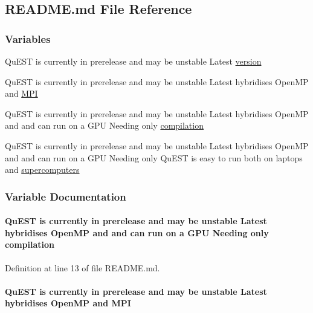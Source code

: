\hypertarget{README_8md}{
\subsection{README.md File Reference}
\label{README_8md}
}
\subsubsection*{Variables}
\begin{DoxyCompactItemize}
\item 
QuEST is currently in prerelease and may be unstable Latest \hyperlink{README_8md_a94df19ae37ab2d673ea00c5d31754e61}{version}
\item 
QuEST is currently in prerelease and may be unstable Latest hybridises OpenMP and \hyperlink{README_8md_a0a40be130c04118a27bcd009eebdaa7b}{MPI}
\item 
QuEST is currently in prerelease and may be unstable Latest hybridises OpenMP and and can run on a GPU Needing only \hyperlink{README_8md_a9deb99efd500e3c4a12304d32da47e19}{compilation}
\item 
QuEST is currently in prerelease and may be unstable Latest hybridises OpenMP and and can run on a GPU Needing only QuEST is easy to run both on laptops and \hyperlink{README_8md_a1a0088f6c565daaa48409371f6c5c36c}{supercomputers}
\end{DoxyCompactItemize}


\subsubsection{Variable Documentation}
\hypertarget{README_8md_a9deb99efd500e3c4a12304d32da47e19}{
\paragraph[{compilation}]{\setlength{\rightskip}{0pt plus 5cm}QuEST is currently in prerelease and may be unstable Latest hybridises OpenMP and and can run on a GPU Needing only {\bf compilation}}\hfill}
\label{README_8md_a9deb99efd500e3c4a12304d32da47e19}


Definition at line 13 of file README.md.\hypertarget{README_8md_a0a40be130c04118a27bcd009eebdaa7b}{
\paragraph[{MPI}]{\setlength{\rightskip}{0pt plus 5cm}QuEST is currently in prerelease and may be unstable Latest hybridises OpenMP and {\bf MPI}}\hfill}
\label{README_8md_a0a40be130c04118a27bcd009eebdaa7b}


